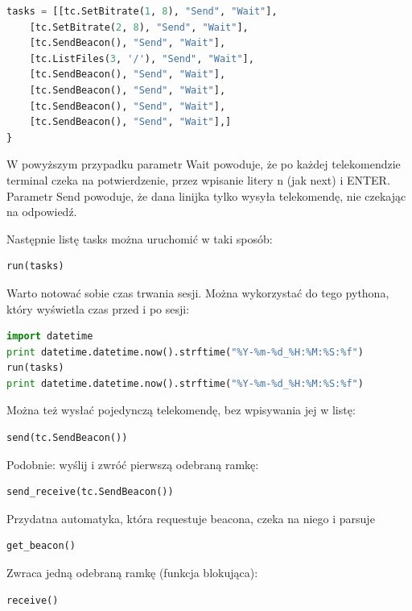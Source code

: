 \begin{lstlisting}[language=Python]
tasks = [[tc.SetBitrate(1, 8), "Send", "Wait"],
	[tc.SetBitrate(2, 8), "Send", "Wait"],
	[tc.SendBeacon(), "Send", "Wait"],
	[tc.ListFiles(3, '/'), "Send", "Wait"],
	[tc.SendBeacon(), "Send", "Wait"],
	[tc.SendBeacon(), "Send", "Wait"],
	[tc.SendBeacon(), "Send", "Wait"],
	[tc.SendBeacon(), "Send", "Wait"],]
}
\end{lstlisting}

W powyższym przypadku parametr Wait powoduje, że po każdej telekomendzie terminal czeka na potwierdzenie, przez wpisanie litery n (jak next) i ENTER. Parametr Send powoduje, że dana linijka tylko wysyła telekomendę, nie czekając na odpowiedź.

Następnie listę tasks można uruchomić w taki sposób:

\begin{lstlisting}[language=Python]
run(tasks)
\end{lstlisting}

Warto notować sobie czas trwania sesji. Można wykorzystać do tego pythona, który wyświetla czas przed i po sesji:

\begin{lstlisting}[language=Python]
import datetime
print datetime.datetime.now().strftime("%Y-%m-%d_%H:%M:%S:%f")
run(tasks)
print datetime.datetime.now().strftime("%Y-%m-%d_%H:%M:%S:%f")
\end{lstlisting}

Można też wysłać pojedynczą telekomendę, bez wpisywania jej w listę:

\begin{lstlisting}[language=Python]
send(tc.SendBeacon())
\end{lstlisting}

Podobnie: wyślij i zwróć pierwszą odebraną ramkę:

\begin{lstlisting}[language=Python]
send_receive(tc.SendBeacon())
\end{lstlisting}

Przydatna automatyka, która requestuje beacona, czeka na niego i parsuje

\begin{lstlisting}[language=Python]
get_beacon()
\end{lstlisting}

Zwraca jedną odebraną ramkę (funkcja blokująca):

\begin{lstlisting}[language=Python]
receive()
\end{lstlisting}

